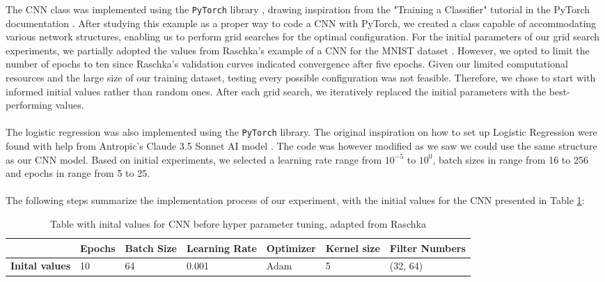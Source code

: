 The CNN class was implemented using the \texttt{PyTorch} library \cite{Paszke2019}, drawing inspiration from the "Training a Classifier" tutorial in the PyTorch documentation \cite{pytorch_cifar10_tutorial}. After studying this example as a proper way to code a CNN with PyTorch, we created a class capable of accommodating various network structures, enabling us to perform grid searches for the optimal configuration. For the initial parameters of our grid search experiments, we partially adopted the values from Raschka's example of a CNN for the MNIST dataset \cite{raschka2022machine}. However, we opted to limit the number of epochs to ten since Raschka's validation curves indicated convergence after five epochs. Given our limited computational resources and the large size of our training dataset, testing every possible configuration was not feasible. Therefore, we chose to start with informed initial values rather than random ones. After each grid search, we iteratively replaced the initial parameters with the best-performing values.
\\
\\
The logistic regression was also implemented using the \texttt{PyTorch} library. The original inspiration on how to set up Logistic Regression were found with help from Antropic's Claude 3.5 Sonnet AI model \cite{anthropic_claude_3_5_sonnet}. The code was however modified as we saw we could use the same structure as our CNN model. Based on initial experiments, we selected a learning rate range from \( 10^{-5}\) to \( 10^0 \), batch sizes in range from 16 to 256 and epochs in range from 5 to 25. 
\\
\\
The following steps summarize the implementation process of our experiment, with the initial values for the CNN presented in Table \ref{tb:initialvalues}:
\begin{table}[H]
    \centering
    \caption{Table with inital values for CNN before hyper parameter tuning, adapted from Raschka \cite{raschka2022machine}}
    
\begin{tabular}{|l|l|l|l|l|l|l|}
\hline
                       & \textbf{Epochs} & \textbf{Batch Size} & \textbf{Learning Rate} & \textbf{Optimizer} & \textbf{Kernel size} & \textbf{Filter Numbers} \\ \hline
\textbf{Inital values} & 10              & 64                  & 0.001                  & Adam               & 5                    & (32, 64)                \\ \hline
\end{tabular}
\label{tb:initialvalues}
\end{table}

